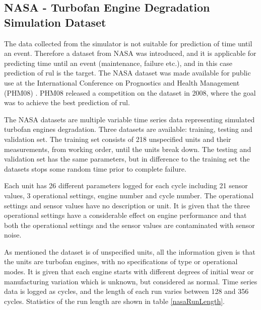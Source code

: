 \documentclass[english, a4paper]{report}
\begin{document}
{{        \subsection{NASA - Turbofan Engine Degradation Simulation Dataset}\label{nasaData}
        {
            The data collected from the simulator is not suitable for prediction of time until an event. Therefore a dataset from NASA was introduced, and it is applicable for predicting time until an event (maintenance, failure etc.), and in this case prediction of \gls{rul} is the target. The NASA dataset was made available for public use at the International Conference on Prognostics and Health Management (PHM08) \cite{nasadata}. PHM08 released a competition on the dataset in 2008, where the goal was to achieve the best prediction of \gls{rul}.
            \par
            The NASA datasets are multiple variable time series data representing simulated turbofan engines degradation. Three datasets are available: training, testing and validation set. The training set consists of 218 unspecified units and their measurements, from working order, until the units break down. The testing and validation set has the same parameters, but in difference to the training set the datasets stops some random time prior to complete failure. 
            \par
            Each unit has 26 different parameters logged for each cycle including 21 sensor values, 3 operational settings, engine number and cycle number. The operational settings and sensor values have no description or unit. It is given that the three operational settings have a considerable effect on engine performance and that both the operational settings and the sensor values are contaminated with sensor noise. 
            \par
            As mentioned the dataset is of unspecified units, all the information given is that the units are turbofan engines, with no specifications of type or operational modes. It is given that each engine starts with different degrees of initial wear or manufacturing variation which is unknown, but considered as normal. Time series data is logged as cycles, and the length of each run varies between 128 and 356 cycles. Statistics of the run length are shown in table \ref{nasaRunLength}.
            
}}}
\end{document}
